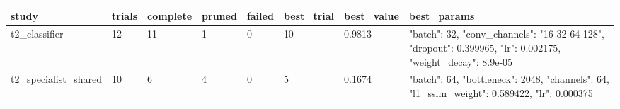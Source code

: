 \begin{tabular}{llllllll}
\hline
study & trials & complete & pruned & failed & best\_trial & best\_value & best\_params \\
\hline
t2\_classifier & 12 & 11 & 1 & 0 & 10 & 0.9813 & {"batch": 32, "conv\_channels": "16-32-64-128", "dropout": 0.399965, "lr": 0.002175, "weight\_decay": 8.9e-05} \\
t2\_specialist\_shared & 10 & 6 & 4 & 0 & 5 & 0.1674 & {"batch": 64, "bottleneck": 2048, "channels": 64, "l1\_ssim\_weight": 0.589422, "lr": 0.000375} \\
\hline
\end{tabular}
